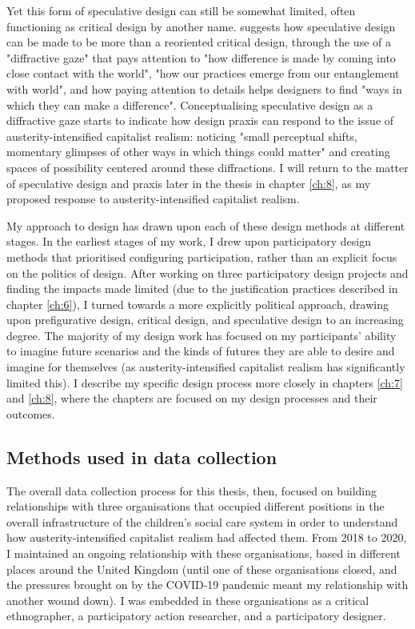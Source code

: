 Yet this form of speculative design can still be somewhat limited, often functioning as critical design by another name. \citet[pp. 183–186]{gatehouse_speculative_2020} suggests how speculative design can be made to be more than a reoriented critical design, through the use of a "diffractive gaze" that pays attention to "how difference is made by coming into close contact with the world", "how our practices emerge from our entanglement with world", and how paying attention to details helps designers to find "ways in which they can make a difference". Conceptualising speculative design as a diffractive gaze starts to indicate how design praxis can respond to the issue of austerity-intensified capitalist realism: noticing "small perceptual shifts, momentary glimpses of other ways in which things could matter" and creating spaces of possibility centered around these diffractions. I will return to the matter of speculative design and praxis later in the thesis in chapter \ref{ch:8}, as my proposed response to austerity-intensified capitalist realism. 

My approach to design has drawn upon each of these design methods at different stages. In the earliest stages of my work, I drew upon participatory design methods that prioritised configuring participation, rather than an explicit focus on the politics of design. After working on three participatory design projects and finding the impacts made limited (due to the justification practices described in chapter \ref{ch:6}), I turned towards a more explicitly political approach, drawing upon prefigurative design, critical design, and speculative design to an increasing degree. The majority of my design work has focused on my participants' ability to imagine future scenarios and the kinds of futures they are able to desire and imagine for themselves (as austerity-intensified capitalist realism has significantly limited this). I describe my specific design process more closely in chapters \ref{ch:7} and \ref{ch:8}, where the chapters are focused on my design processes and their outcomes.
\subsection{Methods used in data collection}
The overall data collection process for this thesis, then, focused on building relationships with three organisations that occupied different positions in the overall infrastructure of the children's social care system in order to understand how austerity-intensified capitalist realism had affected them. From 2018 to 2020, I maintained an ongoing relationship with these organisations, based in different places around the United Kingdom (until one of these organisations closed, and the pressures brought on by the COVID-19 pandemic meant my relationship with another wound down). I was embedded in these organisations as a critical ethnographer, a participatory action researcher, and a participatory designer.

